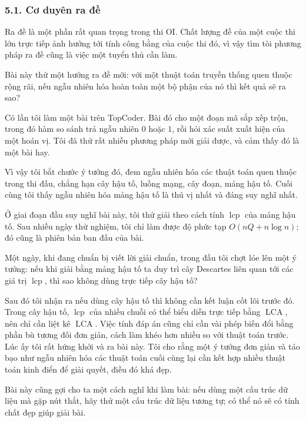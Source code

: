 \documentclass[11pt]{article}
\begin{document}
\subsubsection*{5.1. Cơ duyên ra đề}

Ra đề là một phần rất quan trọng trong thi OI. Chất lượng đề của một cuộc thi
lớn trực tiếp ảnh hưởng tới tính công bằng của cuộc thi đó, vì vậy tìm tòi
phương pháp ra đề cũng là việc một tuyển thủ cần làm.

Bài này thử một hướng ra đề mới: với một thuật toán truyền thống quen thuộc
rộng rãi, nếu ngẫu nhiên hóa hoàn toàn một bộ phận của nó thì kết quả sẽ ra
sao?

Có lần tôi làm một bài trên TopCoder. Bài đó cho một đoạn mã sắp xếp trộn,
trong đó hàm so sánh trả ngẫu nhiên \(0\) hoặc \(1\), rồi hỏi xác suất xuất
hiện của một hoán vị. Tôi đã thử rất nhiều phương pháp mới giải được, và cảm
thấy đó là một bài hay.

Vì vậy tôi bắt chước ý tưởng đó, đem ngẫu nhiên hóa các thuật toán quen thuộc
trong thi đấu, chẳng hạn cây hậu tố, luồng mạng, cây đoạn, mảng hậu tố. Cuối
cùng tôi thấy ngẫu nhiên hóa mảng hậu tố là thú vị nhất và đáng suy nghĩ nhất.

Ở giai đoạn đầu suy nghĩ bài này, tôi thử giải theo cách tính
\(\operatorname{lcp}\) của mảng hậu tố. Sau nhiều ngày thử nghiệm, tôi chỉ làm
được độ phức tạp \(O(nQ+n\log n)\); đó cũng là phiên bản ban đầu của bài.

Một ngày, khi đang chuẩn bị viết lời giải chuẩn, trong đầu tôi chợt lóe lên
một ý tưởng: nếu khi giải bằng mảng hậu tố ta duy trì cây Descartes liên quan
tới các giá trị \(\operatorname{lcp}\), thì sao không dùng trực tiếp cây hậu
tố?

Sau đó tôi nhận ra nếu dùng cây hậu tố thì không cần kết luận cốt lõi trước
đó. Trong cây hậu tố, \(\operatorname{lcp}\) của nhiều chuỗi có thể biểu diễn
trực tiếp bằng \(\operatorname{LCA}\), nên chỉ cần liệt kê \(\operatorname{LCA}\).
Việc tính đáp án cũng chỉ cần vài phép biến đổi bằng phần bù tương đối đơn
giản, cách làm khéo hơn nhiều so với thuật toán trước. Lúc ấy tôi rất hứng
khởi và ra bài này. Tôi cho rằng một ý tưởng đơn giản và táo bạo như ngẫu
nhiên hóa các thuật toán cuối cùng lại cần kết hợp nhiều thuật toán kinh điển
để giải quyết, điều đó khá đẹp.

Bài này cũng gợi cho ta một cách nghĩ khi làm bài: nếu dùng một cấu trúc dữ
liệu mà gặp nút thắt, hãy thử một cấu trúc dữ liệu tương tự; có thể nó sẽ có
tính chất đẹp giúp giải bài.
\end{document}
